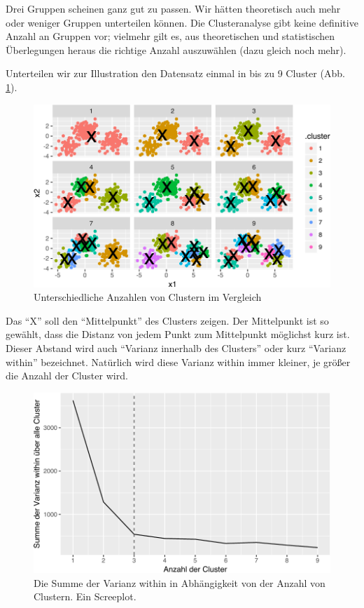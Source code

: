 \documentclass[12pt,ngerman,]{book}
\begin{document}
Drei Gruppen scheinen ganz gut zu passen. Wir hätten theoretisch auch
mehr oder weniger Gruppen unterteilen können. Die Clusteranalyse gibt
keine definitive Anzahl an Gruppen vor; vielmehr gilt es, aus
theoretischen und statistischen Überlegungen heraus die richtige Anzahl
auszuwählen (dazu gleich noch mehr).

Unterteilen wir zur Illustration den Datensatz einmal in bis zu 9
Cluster (Abb. \ref{fig:cluster3}).

\begin{figure}

{\centering \includegraphics[width=0.7\linewidth]{082_Clusteranalyse_files/figure-latex/cluster3-1} 

}

\caption{Unterschiedliche Anzahlen von Clustern im Vergleich}\label{fig:cluster3}
\end{figure}

Das ``X'' soll den ``Mittelpunkt'' des Clusters zeigen. Der Mittelpunkt
ist so gewählt, dass die Distanz von jedem Punkt zum Mittelpunkt
möglichst kurz ist. Dieser Abstand wird auch ``Varianz innerhalb des
Clusters'' oder kurz ``Varianz within'' bezeichnet. Natürlich wird diese
Varianz within immer kleiner, je größer die Anzahl der Cluster wird.

\begin{figure}

{\centering \includegraphics[width=0.7\linewidth]{082_Clusteranalyse_files/figure-latex/cluster4-1} 

}

\caption{Die Summe der Varianz within in Abhängigkeit von der Anzahl von Clustern. Ein Screeplot.}\label{fig:cluster4}
\end{figure}
\end{document}
